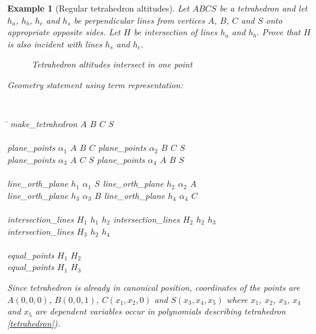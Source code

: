 \documentclass[final,1p,times,authoryear]{elsarticle}
\newtheorem{example}[theorem]{Example}
\begin{document}
\begin{example}[Regular tetrahedron altitudes] 
Let $ABCS$ be a tetrahedron and let $h_a$, $h_b$, $h_c$ and $h_s$ be
perpendicular lines from vertices $A$, $B$, $C$ and $S$ onto
appropriate opposite sides. Let $H$ be intersection of lines $h_a$ and
$h_b$. Prove that $H$ is also incident with lines $h_s$ and $h_c$.

\begin{figure}[hb]
\begin{center}

\end{center}
\caption{Tetrahedron altitudes intersect in one point}
\end{figure}

Geometry statement using term representation:

\begin{footnotesize}
{\tt
\begin{tabbing}
\hspace{5mm}\=\kill
\> make\_tetrahedron $A$ $B$ $C$ $S$ \ \ \ \ \ \ \ \ \ \ \ \ \= \\ \\

\> plane\_points $\alpha_1$ $A$ $B$ $C$ \> plane\_points $\alpha_2$ $B$ $C$ $S$ \\
\>plane\_points $\alpha_3$ $A$ $C$ $S$ \> plane\_points $\alpha_4$ $A$ $B$ $S$ \\ \\

\>line\_orth\_plane $h_1$ $\alpha_1$ $S$ \> line\_orth\_plane $h_2$ $\alpha_2$ $A$ \\
\>line\_orth\_plane $h_3$ $\alpha_3$ $B$ \> line\_orth\_plane $h_4$ $\alpha_4$ $C$ \\ \\

\>intersection\_lines $H_1$ $h_1$ $h_2$ \> intersection\_lines $H_2$ $h_2$ $h_3$ \\
\>intersection\_lines $H_3$ $h_2$ $h_4$ \\ \\

\>equal\_points $H_1$ $H_2$ \\
\>equal\_points $H_1$ $H_3$ \\
\end{tabbing}
}
\end{footnotesize}

Since tetrahedron is already in canonical position, coordinates of the
points are $A(0, 0, 0)$, $B(0, 0, 1)$, $C(x_1, x_2, 0)$ and $S(x_3,
x_4, x_5)$ where $x_1$, $x_2$, $x_3$, $x_4$ and $x_5$ are dependent
variables occur in polynomials describing tetrahedron
\ref{tetrahedron}).


\end{example}
\end{document}
